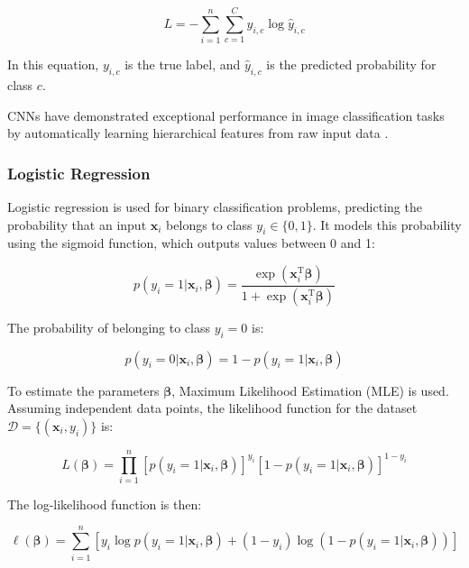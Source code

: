 \begin{equation}
    L = -\sum_{i=1}^n \sum_{c=1}^C y_{i,c} \log \hat{y}_{i,c}
\end{equation}

In this equation, \(y_{i,c}\) is the true label, and \(\hat{y}_{i,c}\) is the predicted probability for class \(c\).

CNNs have demonstrated exceptional performance in image classification tasks by automatically learning hierarchical features from raw input data \cite{raschka2022machine}.


\subsubsection{Logistic Regression}

Logistic regression is used for binary classification problems, predicting the probability that an input $\boldsymbol{x}_i$ belongs to class $y_i \in \{0, 1\}$. It models this probability using the sigmoid function, which outputs values between 0 and 1:

\begin{equation}
    p(y_i = 1 \vert \boldsymbol{x}_i, \boldsymbol{\beta}) = \frac{\exp(\boldsymbol{x}_i^\mathrm{T} \boldsymbol{\beta})}{1 + \exp(\boldsymbol{x}_i^\mathrm{T} \boldsymbol{\beta})}
\end{equation}

The probability of belonging to class $y_i = 0$ is:

\begin{equation}
    p(y_i = 0 \vert \boldsymbol{x}_i, \boldsymbol{\beta}) = 1 - p(y_i = 1 \vert \boldsymbol{x}_i, \boldsymbol{\beta})
\end{equation}

To estimate the parameters $\boldsymbol{\beta}$, Maximum Likelihood Estimation (MLE) is used. Assuming independent data points, the likelihood function for the dataset $\mathcal{D} = \{ (\boldsymbol{x}_i, y_i) \}$ is:

\begin{equation}
    L(\boldsymbol{\beta}) = \prod_{i=1}^n [p(y_i = 1 \vert \boldsymbol{x}_i, \boldsymbol{\beta})]^{y_i} [1 - p(y_i = 1 \vert \boldsymbol{x}_i, \boldsymbol{\beta})]^{1 - y_i}
\end{equation}

The log-likelihood function is then:

\begin{equation}
    \ell(\boldsymbol{\beta}) = \sum_{i=1}^n \left[ y_i \log p(y_i = 1 \vert \boldsymbol{x}_i, \boldsymbol{\beta}) + (1 - y_i) \log \left( 1 - p(y_i = 1 \vert \boldsymbol{x}_i, \boldsymbol{\beta}) \right) \right]
\end{equation}

